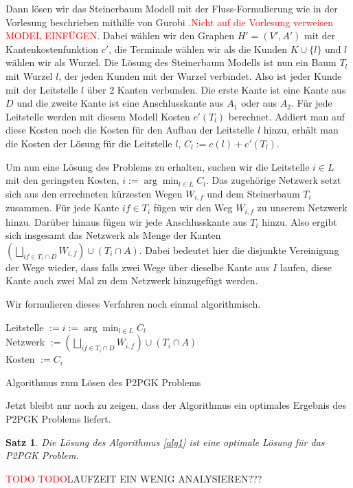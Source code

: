 \documentclass[11pt,a4paper]{article}
\makeatletter
\newcommand{\TODO}{\textcolor{red}{TODO}}
\theoremstyle{my_th_style1}
\newtheorem{satz}{Satz}
\renewenvironment{proof}[1][\proofname]{\par 
	\pushQED{\qed}%
	\normalfont \topsep6\p@\@plus6\p@\relax 
	\trivlist 
	\item[\hskip\labelsep 
	\bfseries 
	#1\@addpunct{:}]\ignorespaces 
}{%
\popQED\endtrivlist\@endpefalse 
}
\makeatother
\begin{document}
Dann lösen wir das Steinerbaum Modell mit der Fluss-Formulierung wie in der Vorlesung beschrieben mithilfe von Gurobi \cite{gurobi}.\textcolor{red}{Nicht auf die Vorlesung verweisen MODEL EINFÜGEN}.
Dabei wählen wir den Graphen $H'=(V',A')$ mit der Kantenkostenfunktion $c'$, die Terminale wählen wir als die Kunden $K \cup \{l\}$ und $l$ w\"ahlen wir als Wurzel. 
Die Lösung des Steinerbaum Modells ist nun ein Baum $T_l$ mit Wurzel $l$, der jeden Kunden mit der Wurzel verbindet. 
Also ist jeder Kunde mit der Leitstelle $l$ über 2 Kanten verbunden. Die erste Kante ist eine Kante aus $D$ und die zweite Kante ist eine Anschlusskante aus $A_1$ oder aus $A_2$. 
Für jede Leitstelle werden mit diesem Modell Kosten $c'(T_l)$ berechnet. 
Addiert man auf diese Kosten noch die Kosten für den Aufbau der Leitstelle $l$ hinzu, erhält man die Kosten der Lösung für die Leitstelle \(l\), $C_l:=c(l)+c'(T_l)$.

Um nun eine Lösung des Problems zu erhalten, suchen wir die Leitstelle $i \in L$ mit den geringsten Kosten, $i:=\arg \displaystyle\min_{l \in L} C_l$.
Das zugehörige Netzwerk setzt sich aus den errechneten kürzesten Wegen  $W_{i,f}$ und dem Steinerbaum $T_i$ zusammen.
Für jede Kante $if \in T_i$ fügen wir den Weg $W_{i,f}$ zu unserem Netzwerk hinzu.
Darüber hinaus fügen wir jede Anschlusskante aus $T_i$ hinzu. Also ergibt sich insgesamt das Netzwerk als Menge der Kanten $(\bigsqcup_{if \in T_i \cap D} W_{i,f}) \cup (T_i\cap A)$.
Dabei bedeutet hier die disjunkte Vereinigung der Wege wieder, dass falls zwei Wege \"uber dieselbe Kante aus \(I\) laufen, diese Kante auch zwei Mal zu dem Netzwerk hinzugef\"ugt werden.

Wir formulieren dieses Verfahren noch einmal algorithmisch.

\vspace{0.5cm}
\begin{algorithm}[H]
	\label{alg1}
\BlankLine

	Leitstelle $:=i:=\arg \displaystyle\min_{l \in L} C_l$\\
	Netzwerk $:=(\bigsqcup_{if \in T_i \cap D}W_{i,f}) \cup (T_i\cap A)$\\
	Kosten $:=C_{i}$
	\BlankLine
\caption{Algorithmus zum Lösen des P2PGK Problems}
\end{algorithm}
\vspace{0.5cm}
Jetzt bleibt nur noch zu zeigen, dass der Algorithmus ein optimales Ergebnis des P2PGK Problems liefert.
\begin{satz}
	Die Lösung des Algorithmus \ref{alg1} ist eine optimale Lösung für das P2PGK Problem.
\end{satz}
\begin{proof}
	\TODO
\end{proof}
\TODO LAUFZEIT EIN WENIG ANALYSIEREN???
\end{document}
